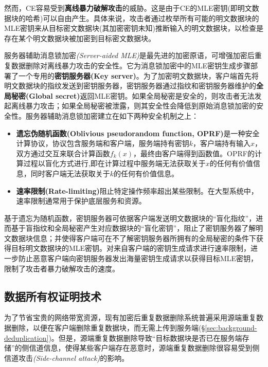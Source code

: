 然而，CE容易受到\textbf{离线暴力破解攻击}的威胁。这是由于CE的MLE密钥(即明文数据块的哈希)可以自由产生。具体来说，攻击者通过枚举所有可能的明文数据块的MLE密钥来从目标密文数据块(其加密密钥未知)推断输入的明文数据块，以检查是存在某个明文数据块被加密到目标密文数据块。

服务器辅助消息锁加密\textit{(Server-aided MLE)}\cite{bellare2013DupLESS}是最先进的加密原语，可增强加密后重复数据删除对离线暴力攻击的安全性。它为消息锁加密中的MLE密钥生成步骤部署了一个专用的\textbf{密钥服务器(Key server)}。为了加密明文数据块，客户端首先将明文数据块的指纹发送到密钥服务器，密钥服务器通过指纹和密钥服务器维护的\textbf{全局秘密(Global secret)}返回MLE密钥。如果全局秘密是安全的，则攻击者无法发起离线暴力攻击；如果全局秘密被泄露，则其安全性会降低到原始消息锁加密的安全性。服务器辅助消息锁加密建立在如下两种安全机制之上：

\begin{itemize}[leftmargin=0em]
    \item \textbf{遗忘伪随机函数(Oblivious pseudorandom function, OPRF)}\cite{naor2004Number}是一种安全计算协议，协议包含服务端和客户端，服务端持有密钥$k$，客户端持有输入$x$，双方通过交互来联合计算函数$f_k(x)$，最终由客户端得到函数值。OPRF的计算过程以盲化方式进行,即在计算过程中服务端无法获取关于$x$的任何有价值信息，同时客户端无法获取关于$k$的任何有价值信息。
    \item \textbf{速率限制(Rate-limiting)}\cite{bellare2013DupLESS}阻止特定操作频率超出某些限制。在大型系统中，速率限制通常用于保护底层服务和资源。
\end{itemize}

基于遗忘为随机函数，密钥服务器可依据客户端发送明文数据块的“盲化指纹”，进而基于盲指纹和全局秘密产生对应数据块的“盲化密钥”，阻止了密钥服务器了解明文数据块信息；并使得客户端可在不了解密钥服务器所拥有的全局秘密的条件下获得目标明文数据块的MLE密钥。对来自客户端的密钥生成请求进行速率限制，进一步防止恶意客户端向密钥服务器发出海量密钥生成请求以获得目标MLE密钥，限制了攻击者暴力破解攻击的速度。

\subsection{数据所有权证明技术}
\label{subsec:background-encrypted-deduplication-pow}

为了节省宝贵的网络带宽资源，现有加密后重复数据删除系统普遍采用源端重复数据删除，以便在客户端删除重复数据块，而无需上传到服务端(\S\ref{sec:background-deduplication})。但是，源端重复数据删除导致“目标数据块是否已在服务端存储”的侧信道信息，使得某些客户端存在恶意时，源端重复数据删除很容易受到侧信道攻击\textit{(Side-channel attack)}\cite{harnik2010side,halevi11}的影响。

